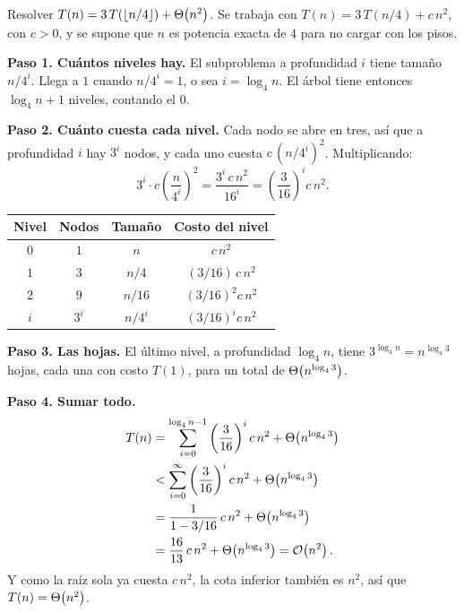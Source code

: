 \documentclass[11pt,letterpaper]{article}
\begin{document}
\begin{ejemplo}
  Resolver $T(n) = 3\,T(\lfloor n/4 \rfloor) + \Theta\!\left(n^2\right)$. Se trabaja
  con $T(n) = 3\,T(n/4) + c\,n^2$, con $c > 0$, y se supone que $n$ es
  potencia exacta de $4$ para no cargar con los pisos.

  \textbf{Paso 1. Cuántos niveles hay.} El subproblema a profundidad
  $i$ tiene tamaño $n/4^i$. Llega a $1$ cuando $n/4^i = 1$, o sea
  $i = \log_4 n$. El árbol tiene entonces $\log_4 n + 1$ niveles,
  contando el $0$.

  \textbf{Paso 2. Cuánto cuesta cada nivel.} Cada nodo se abre en
  tres, así que a profundidad $i$ hay $3^i$ nodos, y cada uno cuesta
  $c\,(n/4^i)^2$. Multiplicando:
  \[
      3^i \cdot c\left(\frac{n}{4^i}\right)^2
      = \frac{3^i\,c\,n^2}{16^i}
      = \left(\frac{3}{16}\right)^{i} c\,n^2 .
  \]

  \begin{center}
  \begin{tabular}{cccc}
    \toprule
    \textbf{Nivel} & \textbf{Nodos} & \textbf{Tamaño}
      & \textbf{Costo del nivel} \\
    \midrule
    $0$ & $1$   & $n$     & $c\,n^2$ \\
    $1$ & $3$   & $n/4$   & $(3/16)\,c\,n^2$ \\
    $2$ & $9$   & $n/16$  & $(3/16)^2 c\,n^2$ \\
    $i$ & $3^i$ & $n/4^i$ & $(3/16)^i c\,n^2$ \\
    \bottomrule
  \end{tabular}
  \end{center}

  \textbf{Paso 3. Las hojas.} El último nivel, a profundidad
  $\log_4 n$, tiene $3^{\log_4 n} = n^{\log_4 3}$ hojas, cada una con
  costo $T(1)$, para un total de $\Theta\!\left(n^{\log_4 3}\right)$.

  \textbf{Paso 4. Sumar todo.}
  \begin{align*}
    T(n) &= \sum_{i=0}^{\log_4 n - 1}
            \left(\frac{3}{16}\right)^{i} c\,n^2
            + \Theta\!\left(n^{\log_4 3}\right) \\
         &< \sum_{i=0}^{\infty}
            \left(\frac{3}{16}\right)^{i} c\,n^2
            + \Theta\!\left(n^{\log_4 3}\right) \\
         &= \frac{1}{1 - 3/16}\,c\,n^2 + \Theta\!\left(n^{\log_4 3}\right) \\
         &= \frac{16}{13}\,c\,n^2 + \Theta\!\left(n^{\log_4 3}\right)
          = \mathcal{O}\!\left(n^2\right) .
  \end{align*}
  Y como la raíz sola ya cuesta $c\,n^2$, la cota inferior también es
  $n^2$, así que $T(n) = \Theta\!\left(n^2\right)$.
\end{ejemplo}
\end{document}
